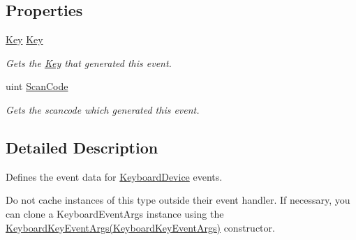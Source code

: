 \subsection*{Properties}
\begin{DoxyCompactItemize}
\item 
\hyperlink{namespace_open_t_k_1_1_input_a30415d20dcc907a84693777cc0bdf1c7}{Key} \hyperlink{class_open_t_k_1_1_input_1_1_keyboard_key_event_args_a9524843e284d227163c419260852768a}{Key}
\begin{DoxyCompactList}\small\item\em Gets the \hyperlink{class_open_t_k_1_1_input_1_1_keyboard_key_event_args_a9524843e284d227163c419260852768a}{Key} that generated this event. \end{DoxyCompactList}\item 
uint \hyperlink{class_open_t_k_1_1_input_1_1_keyboard_key_event_args_a6c078617c6c29f76bc1c771ece1d9604}{Scan\-Code}
\begin{DoxyCompactList}\small\item\em Gets the scancode which generated this event. \end{DoxyCompactList}\end{DoxyCompactItemize}


\subsection{Detailed Description}
Defines the event data for \hyperlink{class_open_t_k_1_1_input_1_1_keyboard_device}{Keyboard\-Device} events. 

Do not cache instances of this type outside their event handler. If necessary, you can clone a Keyboard\-Event\-Args instance using the \hyperlink{class_open_t_k_1_1_input_1_1_keyboard_key_event_args_ac6469a7b5ae43fc078de3949b29dc9fe}{Keyboard\-Key\-Event\-Args(\-Keyboard\-Key\-Event\-Args)} constructor. 

